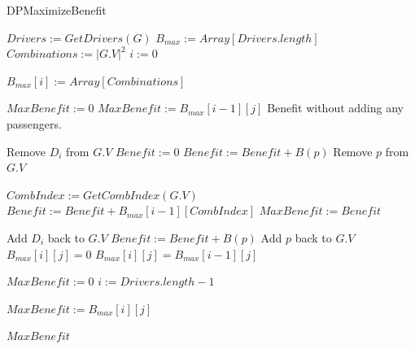 \documentclass{article}
\begin{document}
\begin{algorithm}
\caption{DPMaximizeBenefit}
\begin{algorithmic}[1]

\State $ Drivers := GetDrivers(G) $
\State $ B_{max} := Array[Drivers.length] $
\State $ Combinations := |G.V|^2 $
\State $ i := 0 $
\item {}
  \State $ B_{max}[i] := Array[Combinations] $
\EndFor

\item {}
      \State $ MaxBenefit := 0 $
      \State $ MaxBenefit := B_{max}[i-1][j] $
      \Comment Benefit without adding any passengers.
      \EndIf

      \State Remove $ D_i $ from $ G.V $
        \State $ Benefit := 0 $
          \State $ Benefit := Benefit + B(p) $
          \State Remove $ p $ from $ G.V $
        \EndFor
       
        \State $ CombIndex := GetCombIndex(G.V) $
        \State $ Benefit := Benefit + B_{max}[i - 1][CombIndex] $
          \State $ MaxBenefit := Benefit $
        \EndIf

        \State Add $ D_i $ back to $ G.V $
          \State $ Benefit := Benefit + B(p) $
          \State Add $ p $ back to $ G.V $
        \EndFor
      \EndFor
    \Else
      \State $ B_{max}[i][j] = 0 $  
        \State $ B_{max}[i][j] = B_{max}[i-1][j] $  
      \EndIf
    \EndIf
  \EndFor
\EndFor

\State $ MaxBenefit := 0 $
\State $ i := Drivers.length - 1 $
\item {}
    \State $ MaxBenefit := B_{max}[i][j] $
  \EndIf
\EndFor

\Return $ MaxBenefit $
\EndProcedure
\end{algorithmic}
\label{alg:dynamic_programming}
\end{algorithm}
\end{document}
